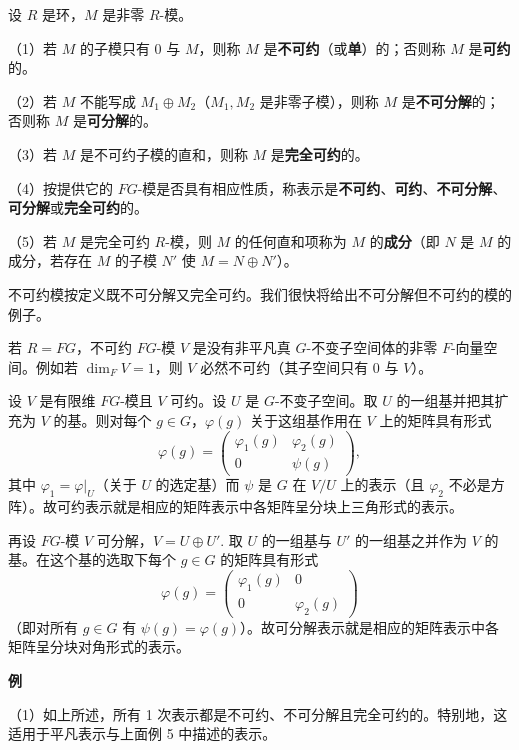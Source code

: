 \begin{definition}
设 \(R\) 是环，\(M\) 是非零 \(R\)-模。

（1）若 \(M\) 的子模只有 0 与 \(M\)，则称 \(M\) 是\textbf{不可约}（或\textbf{单}）的；否则称 \(M\) 是\textbf{可约}的。

（2）若 \(M\) 不能写成 \(M_1 \oplus M_2\)（\(M_1, M_2\) 是非零子模），则称 \(M\) 是\textbf{不可分解}的；否则称 \(M\) 是\textbf{可分解}的。

（3）若 \(M\) 是不可约子模的直和，则称 \(M\) 是\textbf{完全可约}的。

（4）按提供它的 \(FG\)-模是否具有相应性质，称表示是\textbf{不可约}、\textbf{可约}、\textbf{不可分解}、\textbf{可分解}或\textbf{完全可约}的。

（5）若 \(M\) 是完全可约 \(R\)-模，则 \(M\) 的任何直和项称为 \(M\) 的\textbf{成分}（即 \(N\) 是 \(M\) 的成分，若存在 \(M\) 的子模 \(N'\) 使 \(M = N \oplus N'\)）。
\end{definition}

不可约模按定义既不可分解又完全可约。我们很快将给出不可分解但不可约的模的例子。

若 \(R = FG\)，不可约 \(FG\)-模 \(V\) 是没有非平凡真 \(G\)-不变子空间体的非零 \(F\)-向量空间。例如若 \(\dim_FV = 1\)，则 \(V\) 必然不可约（其子空间只有 0 与 \(V\)）。

设 \(V\) 是有限维 \(FG\)-模且 \(V\) 可约。设 \(U\) 是 \(G\)-不变子空间。取 \(U\) 的一组基并把其扩充为 \(V\) 的基。则对每个 \(g \in G\)，\(\varphi(g)\) 关于这组基作用在 \(V\) 上的矩阵具有形式
\[
\varphi(g) = \begin{pmatrix}\varphi_1(g) & \varphi_2(g)\\ 0 & \psi(g)\end{pmatrix},
\]
其中 \(\varphi_1 = \varphi|_U\)（关于 \(U\) 的选定基）而 \(\psi\) 是 \(G\) 在 \(V/U\) 上的表示（且 \(\varphi_2\) 不必是方阵）。故可约表示就是相应的矩阵表示中各矩阵呈分块上三角形式的表示。

再设 \(FG\)-模 \(V\) 可分解，\(V = U \oplus U'\). 取 \(U\) 的一组基与 \(U'\) 的一组基之并作为 \(V\) 的基。在这个基的选取下每个 \(g \in G\) 的矩阵具有形式
\[
\varphi(g) = \begin{pmatrix}\varphi_1(g) & 0\\ 0 & \varphi_2(g)\end{pmatrix}
\]
（即对所有 \(g \in G\) 有 \(\psi(g) = \varphi(g)\)）。故可分解表示就是相应的矩阵表示中各矩阵呈分块对角形式的表示。

\noindent\textbf{例}

（1）如上所述，所有 1 次表示都是不可约、不可分解且完全可约的。特别地，这适用于平凡表示与上面例 5 中描述的表示。

